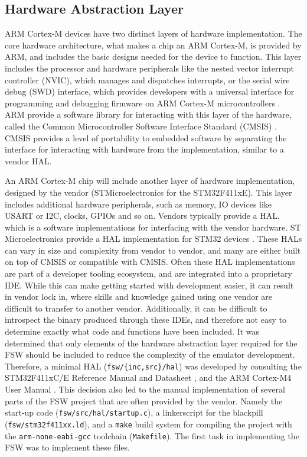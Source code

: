 \documentclass[../report.tex]{subfiles}
\begin{document}
\subsection{Hardware Abstraction Layer} \label{sec:fsw-hal}

ARM Cortex-M devices have two distinct layers of hardware implementation. The
core hardware architecture, what makes a chip an ARM Cortex-M, is provided by
ARM, and includes the basic designs needed for the device to function. This
layer includes the processor and hardware peripherals like the nested vector
interrupt controller (NVIC), which manages and dispatches interrupts, or the
serial wire debug (SWD) interface, which provides developers with a universal
interface for programming and debugging firmware on ARM Cortex-M
microcontrollers \citep{armcm4_manual}. ARM provide a software library for
interacting with this layer of the hardware, called the Common Microcontroller
Software Interface Standard (CMSIS) \citep{CMSIS}. CMSIS provides a level of portability to
embedded software by separating the interface for interacting with hardware
from the implementation, similar to a vendor HAL.

An ARM Cortex-M chip will include another layer of hardware implementation,
designed by the vendor (STMicroelectronics for the STM32F411xE). This
layer includes additional hardware peripherals, such as memory, IO devices like
USART or I2C, clocks, GPIOs and so on. Vendors typically provide a HAL, which
is a software implementations for interfacing with the vendor hardware. ST
Microelectronics provide a HAL implementation for STM32 devices
\citep{stm32hal}. These HALs can vary in size and complexity from vendor to
vendor, and many are either built on top of CMSIS or compatible with CMSIS.
Often these HAL implementations are part of a developer tooling ecosystem, and
are integrated into a proprietary IDE. While this can make getting started
with development easier, it can result in vendor lock in, where skills and
knowledge gained using one vendor are difficult to transfer to another vendor.
Additionally, it can be difficult to introspect the binary produced through
these IDEs, and therefore not easy to determine exactly what code and functions
have been included. It was determined that only elements of the hardware
abstraction layer required for the FSW should be included to reduce the
complexity of the emulator development. Therefore, a minimal HAL
(\lstinline|fsw/{inc,src}/hal|) was developed by consulting the STM32F411xC/E
Reference Manual and Datasheet \citep{stm32f4_manual, stm32f4_datasheet}, and
the ARM Cortex-M4 User Manual \citep{armcm4_manual}. This decision also led to
the manual implementation of several parts of the FSW project that are often
provided by the vendor. Namely the start-up code
(\lstinline|fsw/src/hal/startup.c|), a linkerscript for the blackpill
(\lstinline|fsw/stm32f411xx.ld|), and a \lstinline|make| build system for
compiling the project with the \lstinline|arm-none-eabi-gcc| toolchain
(\lstinline|Makefile|). The first task in implementing the FSW was to implement
these files.
\end{document}

